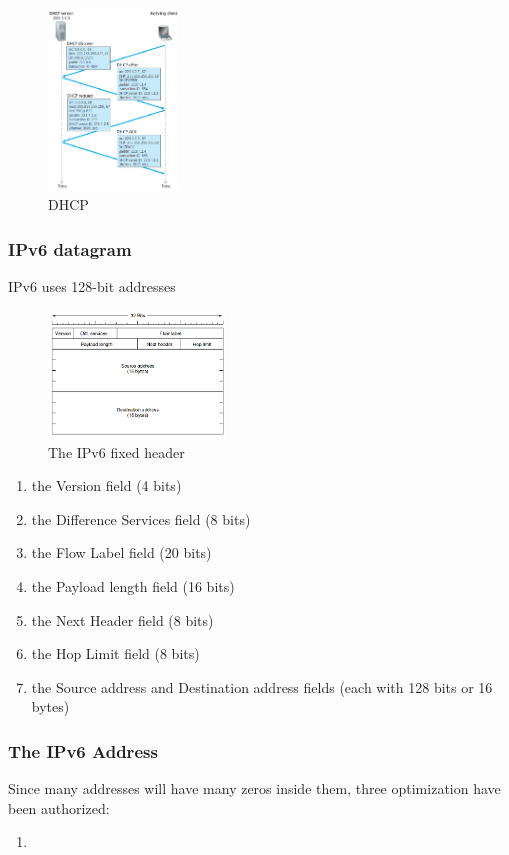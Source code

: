 \begin{figure}[!htb]
    \centering
    \includegraphics[width=0.309\textwidth]{pic/CN5/DHCP.png}
    \caption{DHCP}
\end{figure}


\subsubsection{IPv6 datagram}
IPv6 uses 128-bit addresses
\begin{figure}[!htb]
    \centering
    \includegraphics[width=0.42\textwidth]{pic/CN5/The IPv6 fixed header }
    \caption{The IPv6 fixed header }
\end{figure}

\begin{enumerate}%
    \item the Version field (4 bits)
    \item the Difference Services field (8 bits)
    \item the Flow Label field (20 bits)
    \item the Payload length field (16 bits)
    \item the Next Header field (8 bits)
    \item the Hop Limit field (8 bits)
    \item the Source address and Destination address fields (each
    with 128 bits or 16 bytes)
\end{enumerate}

\subsubsection{The IPv6 Address}
Since many addresses will have many zeros inside them,
three optimization have been authorized:
\begin{enumerate}%
    \item 
\end{enumerate}

